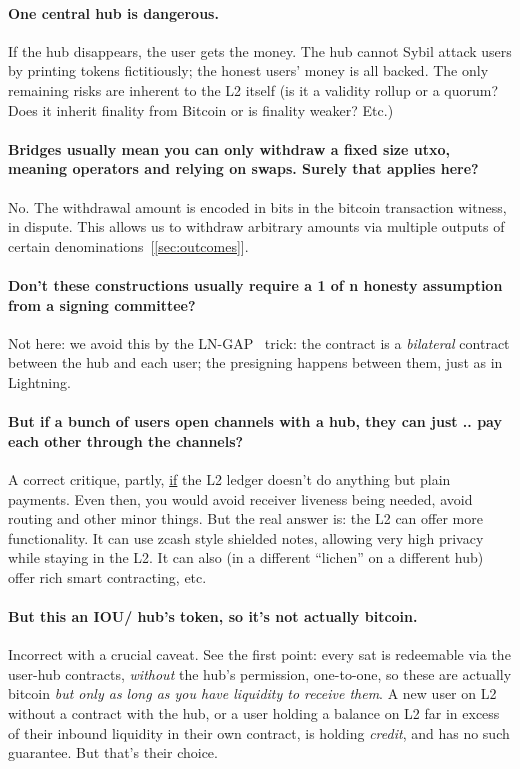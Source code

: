 \documentclass[11pt]{article}
\begin{document}
\paragraph{One central hub is dangerous.} If the hub disappears, the user gets the money. The hub cannot Sybil attack users by printing tokens fictitiously; the honest users' money is all backed. The only remaining risks are inherent to the L2 itself (is it a validity rollup or a quorum? Does it inherit finality from Bitcoin or is finality weaker? Etc.)

\paragraph{Bridges usually mean you can only withdraw a fixed size utxo, meaning operators and relying on swaps. Surely that applies here?} No. The withdrawal amount is encoded in bits in the bitcoin transaction witness, in dispute. This allows us to withdraw arbitrary amounts via multiple outputs of certain denominations~[\ref{sec:outcomes}].

\paragraph{Don't these constructions usually require a 1 of n honesty assumption from a signing committee?} Not here: we avoid this by the LN-GAP~\cite{lngap} trick: the contract is a \emph{bilateral} contract between the hub and each user; the presigning happens between them, just as in Lightning.

\paragraph{But if a bunch of users open channels with a hub, they can just .. pay each other through the channels?} A correct critique, partly, \underline{if} the L2 ledger doesn't do anything but plain payments. Even then, you would avoid receiver liveness being needed, avoid routing and other minor things. But the real answer is: the L2 can offer more functionality. It can use zcash style shielded notes, allowing very high privacy while staying in the L2. It can also (in a different ``lichen'' on a different hub) offer rich smart contracting, etc.

\paragraph{But this an IOU/ hub's token, so it's not actually bitcoin.} Incorrect with a crucial caveat. See the first point: every sat is redeemable via the user-hub contracts, \emph{without} the hub's permission, one-to-one, so these are actually bitcoin \emph{but only as long as you have liquidity to receive them}. A new user on L2 without a contract with the hub, or a user holding a balance on L2 far in excess of their inbound liquidity in their own contract, is holding \emph{credit}, and has no such guarantee. But that's their choice.
\end{document}

